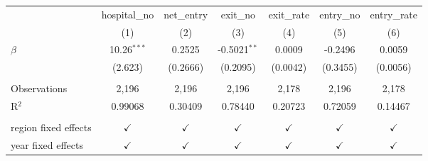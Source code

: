 \begingroup
\centering
\begin{tabular}{lcccccc}
   \toprule
                        & hospital\_no  & net\_entry    & exit\_no       & exit\_rate    & entry\_no     & entry\_rate\\   
                        & (1)           & (2)           & (3)            & (4)           & (5)           & (6)\\  
   \midrule 
   $\beta$              & 10.26$^{***}$ & 0.2525        & -0.5021$^{**}$ & 0.0009        & -0.2496       & 0.0059\\   
                        & (2.623)       & (0.2666)      & (0.2095)       & (0.0042)      & (0.3455)      & (0.0056)\\   
    \\
   Observations         & 2,196         & 2,196         & 2,196          & 2,178         & 2,196         & 2,178\\  
   R$^2$                & 0.99068       & 0.30409       & 0.78440        & 0.20723       & 0.72059       & 0.14467\\  
    \\
   region fixed effects & $\checkmark$  & $\checkmark$  & $\checkmark$   & $\checkmark$  & $\checkmark$  & $\checkmark$\\   
   year fixed effects   & $\checkmark$  & $\checkmark$  & $\checkmark$   & $\checkmark$  & $\checkmark$  & $\checkmark$\\   
   \bottomrule
\end{tabular}
\par\endgroup
